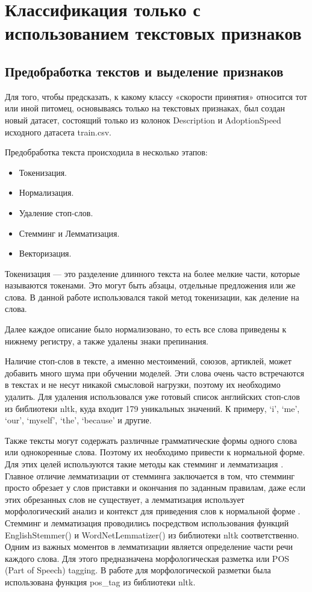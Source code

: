 \documentclass[14pt]{mmcs_article}
\begin{document}
\newpage
\section{Классификация только с использованием текстовых признаков}

\subsection{Предобработка текстов и выделение признаков}

Для того, чтобы предсказать, к какому классу «скорости принятия» относится тот или иной питомец, основываясь только на текстовых признаках, был создан новый датасет, состоящий только из колонок Description и AdoptionSpeed исходного датасета train.csv.

Предобработка текста происходила в несколько этапов:

\begin{itemize}
	\item Токенизация.
	\item Нормализация.
	\item Удаление стоп-слов.
	\item Стемминг и Лемматизация.
	\item Векторизация.
\end{itemize}

Токенизация --- это разделение длинного текста на более мелкие части, которые называются токенами. Это могут быть абзацы, отдельные предложения или же слова. В данной работе использовался такой метод токенизации, как деление на слова.
 
Далее каждое описание было нормализовано, то есть все слова приведены к нижнему регистру, а также удалены знаки препинания. 

Наличие стоп-слов в тексте, а именно местоимений, союзов, артиклей, может добавить много шума при обучении моделей. Эти слова очень часто встречаются в текстах и не несут никакой смысловой нагрузки, поэтому их необходимо удалить. Для удаления использовался уже готовый список английских стоп-слов из библиотеки nltk, куда входит 179 уникальных значений. К примеру, `i', `me', `our', `myself', `the', `because' и другие. 

Также тексты могут содержать различные грамматические формы одного слова или однокоренные слова. Поэтому их необходимо привести к нормальной форме. Для этих целей используются такие методы как стемминг и лемматизация \cite{lib:stemlem}. Главное отличие лемматизации от стемминга заключается в том, что стемминг просто обрезает у слов приставки и окончания по заданным правилам, даже если этих обрезанных слов не существует, а лемматизация использует морфологический анализ и контекст для приведения слов к нормальной форме \cite{lib:langproc}. Стемминг и лемматизация проводились посредством использования функций EnglishStemmer() и WordNetLemmatizer() из библиотеки nltk соответственно. Одним из важных моментов в лемматизации является определение части речи каждого слова. Для этого предназначена морфологическая разметка или POS (Part of Speech) tagging. В работе для морфологической разметки была использована функция pos\_tag из библиотеки nltk.
\end{document}
